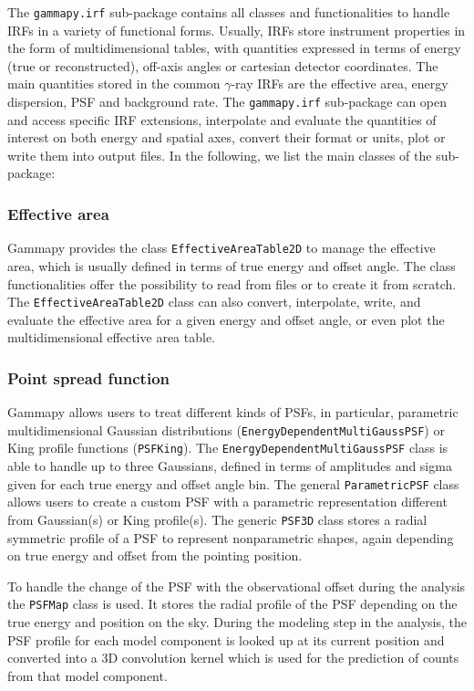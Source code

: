 \documentclass[longauth]{aa}
\newcommand{\code}[1]{\texttt{#1}}
\newcommand{\gammapy}{Gammapy\xspace}
\newcommand{\irf}{IRF\xspace}
\newcommand{\irfs}{IRFs\xspace}
\newcommand{\gammaray}{$\gamma$-ray\xspace}
\begin{document}
The \code{gammapy.irf} sub-package contains all classes and functionalities
to handle IRFs in a variety of functional forms.
Usually, \irfs store instrument properties in the form of multidimensional
tables, with quantities expressed in terms of energy (true or reconstructed),
off-axis angles or cartesian detector coordinates. The main quantities stored in
the common \gammaray \irfs are the effective area, energy dispersion,
PSF and background rate. The \code{gammapy.irf}
sub-package can open and access specific \irf extensions,
interpolate and evaluate the quantities of interest on both energy and spatial
axes, convert their format or units, plot or write them into
output files. In the following, we list the main classes of the
sub-package:

\subsubsection{Effective area}
\gammapy provides the class \code{EffectiveAreaTable2D} to
manage the effective area, which is usually defined in terms of true energy and offset angle.
The class functionalities offer the possibility to read from files or to create
it from scratch. The \code{EffectiveAreaTable2D} class can also convert, interpolate,
write, and evaluate the effective area for a given energy and offset angle, or
even plot the multidimensional effective area table.


\subsubsection{Point spread function}
\gammapy allows users to treat different kinds of PSFs,
in particular, parametric multidimensional Gaussian distributions (\code{EnergyDependentMultiGaussPSF})
or King profile functions (\code{PSFKing}). The \code{EnergyDependentMultiGaussPSF}
class is able to handle up to three Gaussians, defined in terms of amplitudes and sigma given for each true energy
and offset angle bin. The general \code{ParametricPSF} class allows users to create a
custom PSF with a parametric representation different from Gaussian(s) or King profile(s).
The generic \code{PSF3D} class stores a radial symmetric profile of a
PSF to represent nonparametric shapes, again depending on true energy
and offset from the pointing position.

To handle the change of the PSF with the observational offset during the analysis 
the \code{PSFMap} class is used. It stores the radial profile of the PSF
depending on the true energy and position on the sky. During the modeling
step in the analysis, the PSF profile for each model component is 
looked up at its current position and converted into a 3D convolution kernel
which is used for the prediction of counts from that model component.
\end{document}
